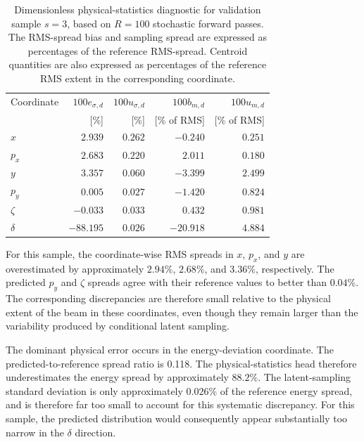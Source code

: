 \begin{table}[H]
\centering
\caption{
Dimensionless physical-statistics diagnostic for validation sample \(s=3\), based on \(R=100\) stochastic forward passes. The RMS-spread bias and sampling spread are expressed as percentages of the reference RMS-spread. Centroid quantities are also expressed as percentages of the reference RMS extent in the corresponding coordinate.}
\label{tab:global_uq_physical_statistics}
\small
\begin{tabular}{lrrrr}
\toprule
Coordinate
&
\(100e_{\sigma,d}\)
&
\(100u_{\sigma,d}\)
&
\(100b_{m,d}\)
&
\(100u_{m,d}\)
\\
&
[\%]
&
[\%]
&
[\% of RMS]
&
[\% of RMS]
\\
\midrule
\(x\)
&
\( 2.939 \)
&
\( 0.262 \)
&
\( -0.240 \)
&
\( 0.251 \)
\\
\(p_x\)
&
\( 2.683 \)
&
\( 0.220 \)
&
\( 2.011 \)
&
\( 0.180 \)
\\
\(y\)
&
\( 3.357 \)
&
\( 0.060 \)
&
\( -3.399 \)
&
\( 2.499 \)
\\
\(p_y\)
&
\( 0.005 \)
&
\( 0.027 \)
&
\( -1.420 \)
&
\( 0.824 \)
\\
\(\zeta\)
&
\( -0.033 \)
&
\( 0.033 \)
&
\( 0.432 \)
&
\( 0.981 \)
\\
\(\delta\)
&
\( -88.195 \)
&
\( 0.026 \)
&
\( -20.918 \)
&
\( 4.884 \)
\\
\bottomrule
\end{tabular}
\end{table}

For this sample, the coordinate-wise RMS spreads in \(x\), \(p_x\), and \(y\) are overestimated by approximately \(2.94\%\), \(2.68\%\), and \(3.36\%\), respectively. The predicted \(p_y\) and \(\zeta\) spreads agree with their reference values to better than \(0.04\%\). The corresponding discrepancies are therefore small relative to the physical extent of the beam in these coordinates, even though they
remain larger than the variability produced by conditional latent sampling.

The dominant physical error occurs in the energy-deviation coordinate. The predicted-to-reference spread ratio is 0.118. The physical-statistics head therefore underestimates the energy spread by approximately \(88.2\%\). The latent-sampling standard deviation is only approximately \(0.026\%\) of the reference energy spread, and is therefore far too small to account for this systematic discrepancy. For this sample, the predicted distribution would consequently appear substantially too narrow in the \(\delta\) direction.

